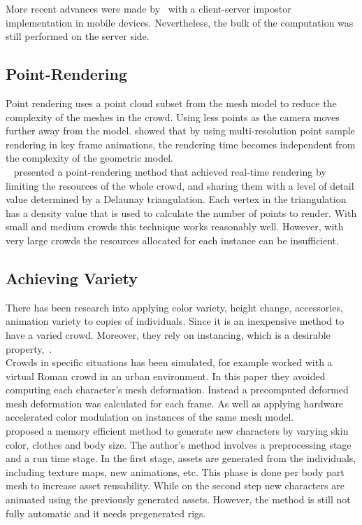\documentclass[6pt]{article} %
\begin{document}
\begin{multicols}{2}
More recent advances were made by~\cite{Ghiletiuc2013} with a client-server impostor implementation in mobile devices.
Nevertheless, the bulk of the computation was still performed on the server side.

\subsection{Point-Rendering}

Point rendering uses a point cloud subset from the mesh model to reduce the complexity of the meshes in the crowd.
Using less points as the camera moves further away from the model.
\cite{Wand2002} showed that by using multi-resolution point sample rendering in key frame animations, the rendering time becomes independent from the complexity of the geometric model.\\

~\cite{Larkin2010} presented a point-rendering method that achieved real-time rendering by limiting the resources of the whole crowd, and sharing them with a level of detail value determined by a Delaunay triangulation. 
Each vertex in the triangulation has a density value that is used to calculate the number of points to render.
With small and medium crowds this technique works reasonably well.
However, with very large crowds the resources allocated for each instance can be insufficient.

\subsection{Achieving Variety}

There has been research into applying color variety, height change, accessories, animation variety to copies of individuals.
Since it is an inexpensive method to have a varied crowd.
Moreover, they rely on instancing, which is a desirable property,~\cite{zelsnack2004glsl}.\\

Crowds in specific situations has been simulated, for example \cite{deHeras2005} worked with a virtual Roman crowd in an urban environment.
In this paper they avoided computing each character’s mesh deformation.
Instead a precomputed deformed mesh deformation was calculated for each frame. 
As well as applying hardware accelerated color modulation on instances of the same mesh model.\\

\cite{ruiz2013} proposed a memory efficient method to generate new characters by varying skin color, clothes and body size.
The author's method involves a preprocessing stage and a run time stage.
In the first stage, assets are generated from the individuals, including texture maps, new animations, etc.
This phase is done per body part mesh to increase asset reusability.
While on the second step new characters are animated using the previously generated assets.
However, the method is still not fully automatic and it needs pregenerated rigs.


\end{multicols}
\end{document}
